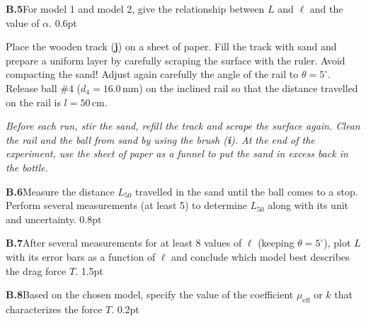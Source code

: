 \textbf{B.5}\quad For model 1 and model 2, give the relationship between $L$
and $\ell$ and the value of $\alpha$. \hfill 0.6pt

Place the wooden track (\textbf{j}) on a sheet of paper. Fill the track with
sand and prepare a uniform layer by carefully scraping the surface with the
ruler. Avoid compacting the sand! Adjust again carefully the angle of the rail
to $\theta = 5^\circ$. Release ball \#4 ($d_4 = 16.0\,\mathrm{mm}$) on the
inclined rail so that the distance travelled on the rail is
$l = 50\,\mathrm{cm}$.

\textit{Before each run, stir the sand, refill the track and scrape the surface
again. Clean the rail and the ball from sand by using the brush
(\textbf{i}). At the end of the experiment, use the sheet of paper as a funnel
to put the sand in excess back in the bottle.}

\textbf{B.6}\quad Measure the distance $L_{50}$ travelled in the sand until the
ball comes to a stop. Perform several measurements (at least 5) to determine
$L_{50}$ along with its unit and uncertainty. \hfill 0.8pt

\textbf{B.7}\quad After several measurements for at least 8 values of $\ell$
(keeping $\theta = 5^\circ$), plot $L$ with its error bars as a function of
$\ell$ and conclude which model best describes the drag force $T$. \hfill 1.5pt

\textbf{B.8}\quad Based on the chosen model, specify the value of the
coefficient $\mu_\mathrm{eff}$ or $k$ that characterizes the force $T$.
\hfill 0.2pt
